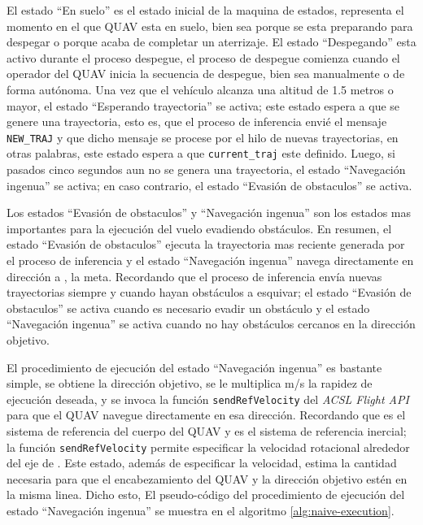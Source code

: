 El estado ``En suelo'' es el estado inicial de la maquina de estados, representa el momento en el que QUAV esta en suelo, bien sea porque se esta preparando para despegar o porque acaba de completar un aterrizaje. El estado ``Despegando'' esta activo durante el proceso despegue, el proceso de despegue comienza cuando el operador del QUAV inicia la secuencia de despegue, bien sea manualmente o de forma autónoma. Una vez que el vehículo alcanza una altitud de 1.5 metros o mayor, el estado ``Esperando trayectoria'' se activa; este estado espera a que se genere una trayectoria, esto es, que el proceso de inferencia envié el mensaje \texttt{NEW\_TRAJ} y que dicho mensaje se procese por el hilo de nuevas trayectorias, en otras palabras, este estado espera a que \texttt{current\_traj} este definido. Luego, si pasados cinco segundos aun no se genera una trayectoria, el estado ``Navegación ingenua'' se activa; en caso contrario, el estado ``Evasión de obstaculos'' se activa.

Los estados ``Evasión de obstaculos'' y ``Navegación ingenua'' son los estados mas importantes para la ejecución del vuelo evadiendo obstáculos. En resumen, el estado ``Evasión de obstaculos'' ejecuta la trayectoria mas reciente generada por el proceso de inferencia y el estado ``Navegación ingenua'' navega directamente en dirección a , la meta. Recordando que el proceso de inferencia envía nuevas trayectorias siempre y cuando hayan obstáculos a esquivar; el estado ``Evasión de obstaculos'' se activa cuando es necesario evadir un obstáculo y el estado ``Navegación ingenua'' se activa cuando no hay obstáculos cercanos en la dirección objetivo. 

El procedimiento de ejecución del estado ``Navegación ingenua'' es bastante simple, se obtiene la dirección objetivo, se le multiplica  m/s la rapidez de ejecución deseada, y se invoca la función \texttt{sendRefVelocity} del \textit{ACSL Flight API} para que el QUAV navegue directamente en esa dirección. Recordando que  es el sistema de referencia del cuerpo del QUAV y  es el sistema de referencia inercial; la función \texttt{sendRefVelocity} permite especificar  la velocidad rotacional alrededor del eje  de . Este estado, además de especificar la velocidad, estima la cantidad  necesaria para que el encabezamiento del QUAV y la dirección objetivo estén en la misma linea. Dicho esto, El pseudo-código del procedimiento de ejecución del estado ``Navegación ingenua'' se muestra en el algoritmo \ref{alg:naive-execution}.

